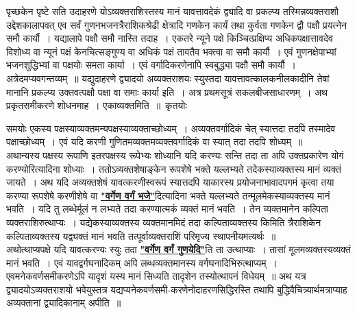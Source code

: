 \documentclass[11pt, openany]{book}
\begin{document}
पृच्छकेन पृष्टे सति उदाहरणे योऽव्यक्तराशिस्तस्य मानं यावत्तावदेकं 
द्व्यादि वा प्रकल्प्य तस्मिन्नव्यक्तराशौ उद्देशकालापवत् एव सर्वं
गुणनभजनत्रैराशिकश्रेढी क्षेत्रादि गणकेन कार्यं तथा कुर्वता गणकेन द्वौ पक्षौ प्रयत्नेन 
समौ कार्यौ~। यद्यालापे पक्षौ समौ नास्ति तदाह~। एकतरे न्यूने पक्षे 
किञ्चित्प्रक्षिप्य अधिकपक्षात्तावदेव विशोध्य वा न्यूनं पक्षं केनचित्सङ्गुण्य वा 
अधिकं पक्षं तावतैव भक्त्वा वा समौ कार्यौ~। एवं गुणनक्षेपाभ्यां 
भजनशुद्धिभ्यां वा पक्षयोः समता कार्या~। एवं वर्गादिकरणेनापि 
स्वबुद्ध्या पक्षौ समौ कार्यौ~। अत्रेदमप्यवगन्तव्यम्~॥ यद्युदाहरणे द्व्यादयो 
अव्यक्तराशयः स्युस्तदा यावत्तावत्कालकनीलकादीनि तेषां मानानि प्रकल्प्य 
उक्तवत्पक्षौ पक्षा वा समाः कार्या इति~। अत्र प्रथमसूत्रं सकलबीजसाधारणम्~। अथ प्रकृतसमीकरणे शोधनमाह~। एकाव्यक्तमिति~॥~कृतयोः
 \newpage%

\noindent समयोः एकस्य पक्षस्याव्यक्तमन्यपक्षस्याव्यक्ताच्छोध्यम्~।
अव्यक्तवर्गादिकं चेत् स्यात्तदा तदपि तस्मादेव पक्षाच्छोध्यम्~। एवं यदि करणी गुणितमव्यक्तमव्यक्तवर्गादिकं वा स्यात् तदा तदपि शोध्यम्~॥~\\

\vspace{-3mm}
 अथान्यस्य पक्षस्य रूपाणि इतरपक्षस्य रूपेभ्यः शोध्यानि यदि 
करण्यः सन्ति तदा ता अपि उक्तप्रकारेण योगं करण्योरित्यादिना शोध्याः~। 
ततोऽव्यक्तशेषाङ्केन रूपशेषे भक्ते यल्लभ्यते तदेकस्याव्यक्तस्य मानं व्यक्तं 
जायते~। अथ यदि अव्यक्तशेषं यावत्करणीस्वरूपं स्यात्तदपि याकारस्य 
प्रयोजनाभावादपगमं कृत्वा तया करण्या रूपशेषे करणीशेषे वा \hyperref[12]{\textbf{"वर्गेण वर्गं भजे"}}दित्यादिना भक्ते यल्लभ्यते तन्मूलमेकस्याव्यक्तस्य मानं भवति~। यदि तु लब्धेर्मूलं न लभ्यते तदा करण्यात्मकं व्यक्तं मानं भवति~। 
तेन व्यक्तमानेन कल्पिता व्यक्तराशिरुत्थाप्यः~। यद्येकस्याव्यक्तस्य
व्यक्तमानमिदं तदा कल्पिताव्यक्तस्य किमिति त्रैराशिकेन कल्पिताव्यक्तस्य यद्व्यक्तं 
मानं भवति तत्पूर्वाव्यक्तराशिं परिमृज्य स्थापनीयमत्यर्थः~॥~\\

\vspace{-3mm}
 अथोत्थाप्यपक्षे यदि यावत्करण्यः स्युः तदा \hyperref[12]{\textbf{"वर्गेण वर्गं गुणयेदि"}}ति ता उत्थाप्याः~। तासां मूलमव्यक्तस्यव्यक्तं मानं भवति~। एवं यावद्वर्गघनादिकम् अपि लब्धव्यक्तमानस्य वर्गघनादिभिरुत्थाप्यम्~। एवमनेकवर्णसमीकरणेऽपि यादृशं यस्य मानं सिध्यति तादृशेन तस्योत्थापनं विधेयम्~॥ अथ यत्र द्व्यादयोऽव्यक्तराशयो भवेयुस्तत्र यद्यप्यनेकवर्णसमी-करणेनोदाहरणसिद्धिरस्ति तथापि बुद्धिवैचित्र्यार्थमत्राप्याह अव्यक्तानां द्व्यादिकानाम् अपीति~॥~\\
\end{document}
